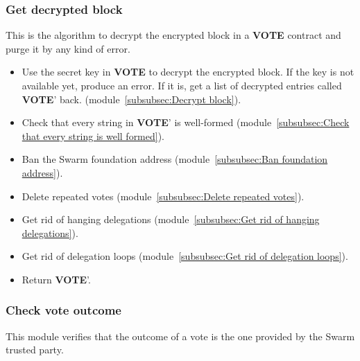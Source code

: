 \documentclass[submission, copyright,creativecommons,sharealike,noncommercial]{eptcs}
\newcommand{\Vote}{\textbf{VOTE}\xspace}
\begin{document}
\subsubsection{Get decrypted block}\label{subsubsec:Get decrypted block}
	This is the algorithm to decrypt the encrypted block in a \Vote contract and purge it by any kind of error.
	\begin{itemize}
		\item Use the secret key in \Vote to decrypt the encrypted block. If the key is not available yet, produce an error. If it is, get a list of decrypted entries called \Vote' back. (module~\ref{subsubsec:Decrypt block}).
		\item Check that every string in \Vote' is well-formed (module~\ref{subsubsec:Check that every string is well formed}).
		\item Ban the Swarm foundation address (module~\ref{subsubsec:Ban foundation address}).
		\item Delete repeated votes (module~\ref{subsubsec:Delete repeated votes}).
		\item Get rid of hanging delegations (module~\ref{subsubsec:Get rid of hanging delegations}).
		\item Get rid of delegation loops (module~\ref{subsubsec:Get rid of delegation loops}).
		\item Return \Vote'.
	\end{itemize}


\subsubsection{Check vote outcome}\label{subsubsec:Calculate vote outcome}
This module verifies that the outcome of a vote is the one provided by the Swarm trusted party. 
\end{document}
